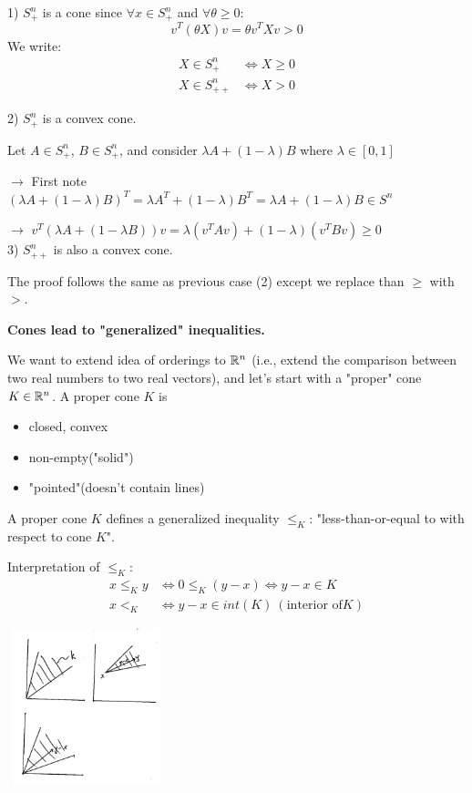 1) $S_+^n$ is a cone since $\forall x \in S_+^n$ and $\forall \theta \geq 0$:
$$v^T(\theta X)v = \theta v^TXv  > 0$$
We write:
\begin{align*}
X\in S^n_+ &\Leftrightarrow X\geq 0\\
X\in S^n_{++} &\Leftrightarrow X> 0
\end{align*}

2) $S_+^n$ is a convex cone.

Let $A\in S^n_+$, $B\in S^n_+$, and consider $\lambda A + (1-\lambda)B$ where $\lambda \in [0,1]$

$\rightarrow$ First note $(\lambda A + (1-\lambda)B)^T= \lambda A^T + (1-\lambda)B^T = \lambda A + (1-\lambda)B \in S^n$

$\rightarrow$ $v^T(\lambda A + (1-\lambda B))v =\lambda(v^TAv) + (1-\lambda)(v^TBv)\geq 0$\\

 
3) $S^n_{++}$ is also a convex cone. 

The proof follows the same as previous case (2) except we replace than $\geq$ with $>$.

\vspace{0.3cm}
\textbf{Cones lead to "generalized" inequalities.}

We want to extend idea of orderings to $\mathbb{R}^n$ (i.e., extend the comparison between two real numbers to two real vectors), and let's start with a "proper" cone $K\in \mathbb{R}^n$. A proper cone $K$ is
\begin{itemize}
	\item closed, convex
	
	\item non-empty("solid")
	
	\item "pointed"(doesn't contain lines)
\end{itemize}


A proper cone $K$ defines a generalized inequality $\leq_K$: "less-than-or-equal to with respect to cone $K$".

Interpretation of $\leq_K$:
\begin{align*}
x\leq_K y &\Leftrightarrow 0\leq_K (y-x)\Leftrightarrow y - x \in K\\
x <_K &\Leftrightarrow y-x\in int(K)\ (\text{interior of} K)
\end{align*}

\begin{marginfigure}
	\centering
	\includegraphics[width=1.8in,height=1.8in]{figures/ch08/figure1030_1.png}
\end{marginfigure}


